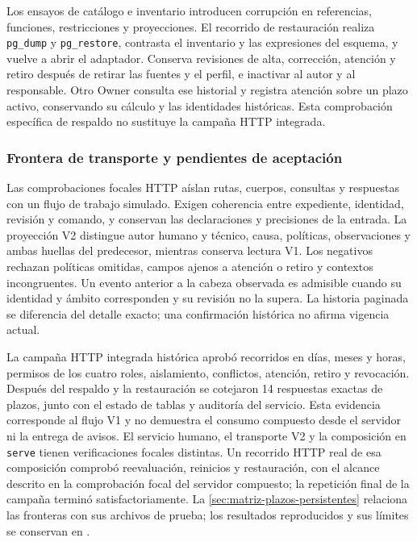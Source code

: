 Los ensayos de catálogo e inventario introducen corrupción en referencias, funciones, restricciones y proyecciones. El recorrido de restauración realiza \texttt{pg\_dump} y \texttt{pg\_restore}, contrasta el inventario y las expresiones del esquema, y vuelve a abrir el adaptador. Conserva revisiones de alta, corrección, atención y retiro después de retirar las fuentes y el perfil, e inactivar al autor y al responsable. Otro Owner consulta ese historial y registra atención sobre un plazo activo, conservando su cálculo y las identidades históricas. Esta comprobación específica de respaldo no sustituye la campaña HTTP integrada.

\subsubsection{Frontera de transporte y pendientes de aceptación}

Las comprobaciones focales HTTP aíslan rutas, cuerpos, consultas y respuestas con un flujo de trabajo simulado. Exigen coherencia entre expediente, identidad, revisión y comando, y conservan las declaraciones y precisiones de la entrada. La proyección V2 distingue autor humano y técnico, causa, políticas, observaciones y ambas huellas del predecesor, mientras conserva lectura V1. Los negativos rechazan políticas omitidas, campos ajenos a atención o retiro y contextos incongruentes. Un evento anterior a la cabeza observada es admisible cuando su identidad y ámbito corresponden y su revisión no la supera. La historia paginada se diferencia del detalle exacto; una confirmación histórica no afirma vigencia actual.

La campaña HTTP integrada histórica aprobó recorridos en días, meses y horas, permisos de los cuatro roles, aislamiento, conflictos, atención, retiro y revocación. Después del respaldo y la restauración se cotejaron 14 respuestas exactas de plazos, junto con el estado de tablas y auditoría del servicio. Esta evidencia corresponde al flujo V1 y no demuestra el consumo compuesto desde el servidor ni la entrega de avisos. El servicio humano, el transporte V2 y la composición en \texttt{serve} tienen verificaciones focales distintas. Un recorrido HTTP real de esa composición comprobó reevaluación, reinicios y restauración, con el alcance descrito en la comprobación focal del servidor compuesto; la repetición final de la campaña terminó satisfactoriamente. La \cref{sec:matriz-plazos-persistentes} relaciona las fronteras con sus archivos de prueba; los resultados reproducidos y sus límites se conservan en .

